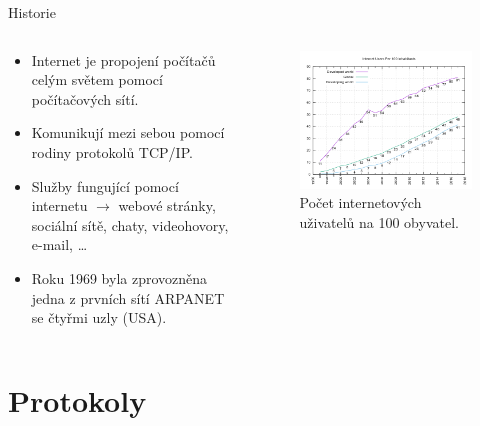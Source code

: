 \documentclass[aspectratio=169,xcolor=dvipsnames, t]{beamer}
\begin{document}
\begin{frame}{Historie}
    \vspace{-0.5cm}
    \begin{columns}
    \begin{column}{0.45\textwidth}
    \begin{itemize}
        \item Internet je propojení počítačů celým světem pomocí počítačových sítí. 
        \item Komunikují mezi sebou pomocí rodiny protokolů TCP/IP.
        \item Služby fungující pomocí internetu $\rightarrow$ webové stránky, sociální sítě, chaty, videohovory, e-mail, \ldots
        \item Roku 1969 byla zprovozněna jedna z prvních sítí ARPANET se čtyřmi uzly (USA).
    \end{itemize}
\end{column}
\begin{column}{0.45\textwidth}
    \begin{figure}
        \includegraphics[width=\textwidth]{Internet_users_per_100_inhabitants_ITU}
        \caption{Počet internetových uživatelů na 100 obyvatel.}
    \end{figure}
\end{column}
\end{columns}
\end{frame}

\section{Protokoly}
\end{document}
